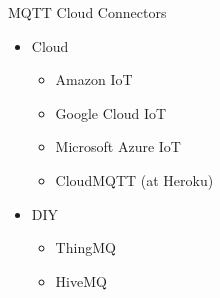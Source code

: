 \begin{frame}{MQTT Cloud Connectors}
\protect\hypertarget{mqtt-cloud-connectors}{}

\begin{itemize}
\tightlist
\item
  Cloud

  \begin{itemize}
  \tightlist
  \item
    Amazon IoT
  \item
    Google Cloud IoT
  \item
    Microsoft Azure IoT
  \item
    CloudMQTT (at Heroku)
  \end{itemize}
\item
  DIY

  \begin{itemize}
  \tightlist
  \item
    ThingMQ
  \item
    HiveMQ
  \end{itemize}
\end{itemize}


\end{frame}

